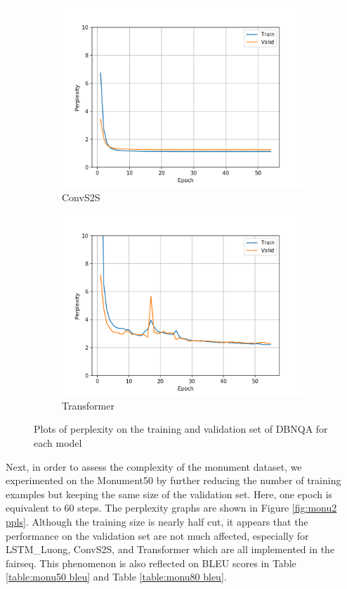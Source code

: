 \begin{figure}[H]
\begin{subfigure}{0.45\textwidth}
\includegraphics[width=\textwidth]{../results/dbnqa1/run1/fconv_wmt_en_de/ppls.png} 
\caption{ConvS2S}
\label{fig:dbnqa convs2s ppl}
\end{subfigure}
\hfill
\begin{subfigure}{0.45\textwidth}
\includegraphics[width=\textwidth]{../results/dbnqa1/run1/transformer_iwslt_de_en/ppls.png}
\caption{Transformer}
\label{fig:dbnqa transformer ppl}
\end{subfigure}
\hfill
\caption{Plots of perplexity on the training and validation set of DBNQA for each model}
\label{fig:dbnqa ppls}
\end{figure}
Next, in order to assess the complexity of the monument dataset, we experimented on the Monument50 by further reducing the number of training examples but keeping the same size of the validation set. Here, one epoch is equivalent to 60 steps. The perplexity graphs are shown in Figure \ref{fig:monu2 ppls}. Although the training size is nearly half cut, it appears that the performance on the validation set are not much affected, especially for LSTM\_Luong, ConvS2S, and Transformer which are all implemented in the fairseq. This phenomenon is also reflected on BLEU scores in Table \ref{table:monu50 bleu} and Table \ref{table:monu80 bleu}.  

